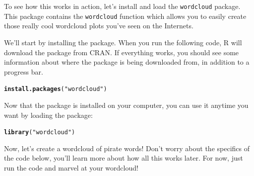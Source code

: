 \documentclass{tufte-book}\usepackage[]{graphicx}\usepackage[]{color}
\makeatletter
\newcommand{\hlstr}[1]{\textcolor[rgb]{0.192,0.494,0.8}{#1}}%
\newcommand{\hlstd}[1]{\textcolor[rgb]{0.345,0.345,0.345}{#1}}%
\newcommand{\hlkwd}[1]{\textcolor[rgb]{0.737,0.353,0.396}{\textbf{#1}}}%
\newenvironment{kframe}{%
 \def\at@end@of@kframe{}%
 \ifinner\ifhmode%
  \def\at@end@of@kframe{\end{minipage}}%
  \begin{minipage}{\columnwidth}%
 \fi\fi%
 \def\FrameCommand##1{\hskip\@totalleftmargin \hskip-\fboxsep
 \colorbox{shadecolor}{##1}\hskip-\fboxsep
     \hskip-\linewidth \hskip-\@totalleftmargin \hskip\columnwidth}%
 \MakeFramed {\advance\hsize-\width
   \@totalleftmargin\z@ \linewidth\hsize
   \@setminipage}}%
 {\par\unskip\endMakeFramed%
 \at@end@of@kframe}
\newenvironment{knitrout}{}{} %
\makeatother
\begin{document}
To see how this works in action, let's install and load the \texttt{wordcloud} package. This package contains the \texttt{wordcloud} function which allows you to easily create those really cool wordcloud plots you've seen on the Internets.

We'll start by installing the package. When you run the following code, R will download the package from CRAN. If everything works, you should see some information about where the package is being downloaded from, in addition to a progress bar.

\begin{knitrout}
\color{fgcolor}\begin{kframe}
\begin{alltt}
\hlkwd{install.packages}\hlstd{(}\hlstr{"wordcloud"}\hlstd{)}
\end{alltt}
\end{kframe}
\end{knitrout}

Now that the package is installed on your computer, you can use it anytime you want by loading the package:

\begin{knitrout}
\color{fgcolor}\begin{kframe}
\begin{alltt}
\hlkwd{library}\hlstd{(}\hlstr{"wordcloud"}\hlstd{)}
\end{alltt}


{\ttfamily\noindent\itshape\color{messagecolor}{\#\# Loading required package: RColorBrewer}}\end{kframe}
\end{knitrout}

Now, let's create a wordcloud of pirate words! Don't worry about the specifics of the code below, you'll learn more about how all this works later. For now, just run the code and marvel at your wordcloud!
\end{document}
